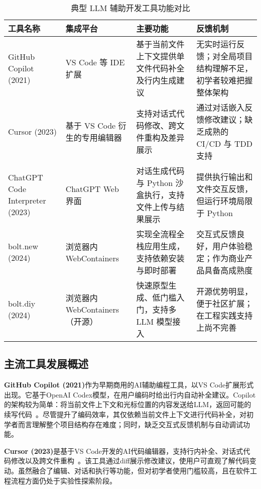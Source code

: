 \begin{table}[htbp]
\centering
\footnotesize
\caption{典型 LLM 辅助开发工具功能对比}
\label{tab:llm-tools}
\setlength{\tabcolsep}{3pt}
\begin{tabular}{>{\raggedright\arraybackslash}p{2.4cm}>{\raggedright\arraybackslash}p{2.6cm}>{\raggedright\arraybackslash}p{3.6cm}>{\raggedright\arraybackslash}p{4.6cm}}
\toprule
\textbf{工具名称} & \textbf{集成平台} & \textbf{主要功能} & \textbf{反馈机制} \\
\midrule
GitHub Copilot (2021) & VS Code 等 IDE 扩展 & 基于当前文件上下文提供单文件代码补全及行内生成建议 & 无实时运行反馈；对全局项目结构理解不足，初学者较难把握整体架构 \\
\addlinespace
Cursor (2023) & 基于 VS Code 衍生的专用编辑器 & 支持对话式代码修改、跨文件重构及差异展示 & 通过对话嵌入反馈修改建议；缺乏成熟的 CI/CD 与 TDD 支持 \\
\addlinespace
ChatGPT Code Interpreter (2023) & ChatGPT Web 界面 & 对话生成代码与 Python 沙盒执行，支持文件上传与结果展示 & 提供执行输出和文件交互反馈，但运行环境局限于 Python \\
\addlinespace
bolt.new (2024) & 浏览器内 WebContainers & 实现全流程全栈应用生成，支持依赖安装与即时部署 & 交互式反馈良好，用户体验稳定；作为商业产品具备高成熟度 \\
\addlinespace
bolt.diy (2024) & 浏览器内 WebContainers（开源） & 快速原型生成、低门槛入门，支持多 LLM 模型接入 & 开源优势明显，便于社区扩展；在工程实践支持上尚不完善 \\
\bottomrule
\end{tabular}
\end{table}

\subsection{主流工具发展概述}

\textbf{GitHub Copilot (2021)}作为早期商用的AI辅助编程工具，以VS Code扩展形式出现。它基于OpenAI Codex模型，在用户编码时给出行内自动补全建议。Copilot的架构较为简单：将当前文件上下文和光标位置的内容发送给LLM，返回可能的续写代码~\cite{DivaCopilot}。尽管提升了编码效率，其仅依赖当前文件上下文进行代码补全，对初学者而言理解整个项目结构存在难度；同时，缺乏交互式反馈机制与自动调试功能。

\textbf{Cursor (2023)}是基于VS Code开发的AI代码编辑器，支持行内补全、对话式代码修改以及跨文件重构~\cite{CursorReview}。该工具通过diff展示修改建议，使用户可直观了解代码变动。虽然融合了编辑、对话和执行等功能，但对初学者使用门槛较高，且在软件工程流程方面仍处于实验性探索阶段。

